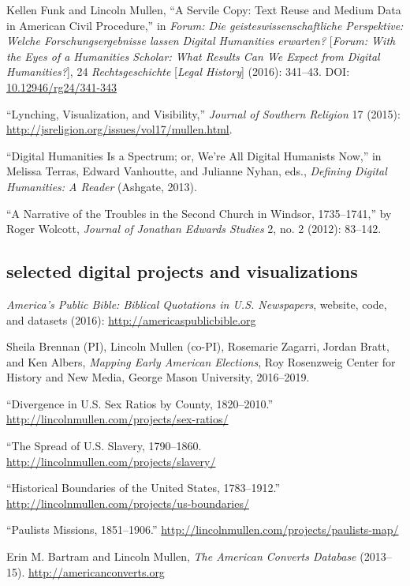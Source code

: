 \documentclass[11pt]{article}
\begin{document}
Kellen Funk and Lincoln Mullen, ``A Servile Copy: Text Reuse and Medium Data 
in American Civil Procedure,'' in \emph{Forum: Die geisteswissenschaftliche 
  Perspektive: Welche Forschungsergebnisse lassen Digital Humanities 
  erwarten?} [\emph{Forum: With the Eyes of a Humanities Scholar: What Results 
  Can We Expect from Digital Humanities?}], 24 \emph{Rechtsgeschichte} 
[\emph{Legal History}] (2016): 341--43. DOI: \href{http://dx.doi.org/10.12946/rg24/341-343}{10.12946/rg24/341-343}

``Lynching, Visualization, and Visibility,'' \emph{Journal of Southern 
  Religion} 17 (2015): \url{http://jsreligion.org/issues/vol17/mullen.html}.

``Digital Humanities Is a Spectrum; or, We're All Digital Humanists
Now,'' in Melissa Terras, Edward Vanhoutte, and Julianne Nyhan, eds.,
\emph{Defining Digital Humanities: A Reader} (Ashgate, 2013).

``A Narrative of the Troubles in the Second Church in Windsor,
1735--1741,'' by Roger Wolcott, \emph{Journal of Jonathan Edwards
  Studies} 2, no. 2 (2012): 83--142.

\subsection{selected digital projects and visualizations}\label{digital-projects}

\emph{America's Public Bible: Biblical Quotations in U.S. Newspapers}, 
website, code, and datasets (2016): \url{http://americaspublicbible.org}

Sheila Brennan (PI), Lincoln Mullen (co-PI), Rosemarie Zagarri, Jordan Bratt, 
and Ken Albers, \emph{Mapping Early American Elections}, Roy Rosenzweig Center 
for History and New Media, George Mason University, 2016--2019.

``Divergence in U.S. Sex Ratios by County, 1820--2010.'' 
\url{http://lincolnmullen.com/projects/sex-ratios/}

``The Spread of U.S.  Slavery, 1790--1860.  
\url{http://lincolnmullen.com/projects/slavery/}

``Historical Boundaries of the United States, 1783--1912.'' 
\url{http://lincolnmullen.com/projects/us-boundaries/}

``Paulists Missions, 1851--1906.'' 
\url{http://lincolnmullen.com/projects/paulists-map/}

Erin M. Bartram and Lincoln Mullen, \emph{The American Converts Database} 
(2013--15). \url{http://americanconverts.org}
\end{document}
